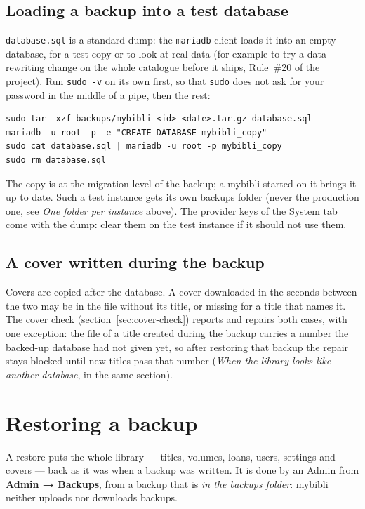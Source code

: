 \subsection*{Loading a backup into a test database}
\label{sec:backups-test-db}

\texttt{database.sql} is a standard dump: the \texttt{mariadb} client
loads it into an empty database, for a test copy or to look at real
data (for example to try a data-rewriting change on the whole catalogue
before it ships, Rule~\#20 of the project). Run \texttt{sudo -v} on its
own first, so that \texttt{sudo} does not ask for your password in the
middle of a pipe, then the rest:
\begin{lstlisting}
sudo tar -xzf backups/mybibli-<id>-<date>.tar.gz database.sql
mariadb -u root -p -e "CREATE DATABASE mybibli_copy"
sudo cat database.sql | mariadb -u root -p mybibli_copy
sudo rm database.sql
\end{lstlisting}
The copy is at the migration level of the backup; a mybibli started on
it brings it up to date. Such a test instance gets its own backups
folder (never the production one, see \emph{One folder per instance}
above). The provider keys of the System tab come with the dump: clear
them on the test instance if it should not use them.

\subsection*{A cover written during the backup}

Covers are copied after the database. A cover downloaded in the
seconds between the two may be in the file without its title, or
missing for a title that names it. The cover check
(section~\ref{sec:cover-check}) reports and repairs both cases, with
one exception: the file of a title created during the backup carries a
number the backed-up database had not given yet, so after restoring
that backup the repair stays blocked until new titles pass that number
(\emph{When the library looks like another database}, in the same
section).

\section{Restoring a backup}
\label{sec:backups-restore}

A restore puts the whole library --- titles, volumes, loans, users,
settings and covers --- back as it was when a backup was written. It
is done by an Admin from \textbf{Admin → Backups}, from a backup that
is \emph{in the backups folder}: mybibli neither uploads nor downloads
backups.

